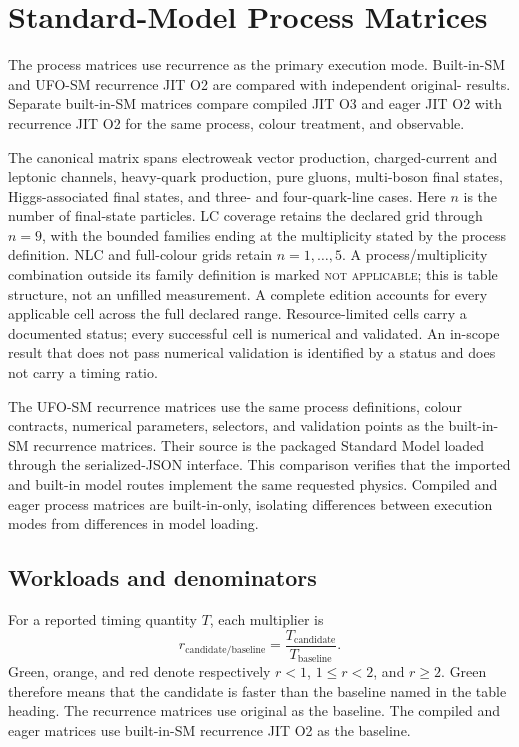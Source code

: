 \section{Standard-Model Process Matrices}
\label{sec:three-mode-performance-tables}

The process matrices use recurrence as the primary \PAC{} execution mode.
Built-in-SM and UFO-SM recurrence JIT O2 are compared with independent
original-\AC{} results.  Separate built-in-SM matrices compare compiled JIT O3
and eager JIT O2 with recurrence JIT O2 for the same process, colour treatment,
and observable.

The canonical matrix spans electroweak vector production, charged-current and
leptonic channels, heavy-quark production, pure gluons, multi-boson final
states, Higgs-associated final states, and three- and four-quark-line cases.
Here \(n\) is the number of final-state particles.  LC coverage retains the
declared grid through \(n=9\), with the bounded families ending at the
multiplicity stated by the process definition.  NLC and full-colour grids
retain \(n=1,\ldots,5\).  A process/multiplicity combination outside its family
definition is marked \textsc{not applicable}; this is table structure, not an
unfilled measurement.  A complete edition accounts for every applicable cell
across the full declared range.  Resource-limited cells carry a documented
status; every successful cell is numerical and validated.  An in-scope result
that does not pass numerical validation is identified by a status and does
not carry a timing ratio.

The UFO-SM recurrence matrices use the same process definitions, colour
contracts, numerical parameters, selectors, and validation points as the
built-in-SM recurrence matrices. Their source is the packaged Standard Model
loaded through the serialized-JSON interface. This comparison verifies that the
imported and built-in model routes implement the same requested physics.
Compiled and eager process matrices are built-in-only, isolating differences
between execution modes from differences in model loading.



\subsection*{Workloads and denominators}

For a reported timing quantity \(T\), each multiplier is
\begin{equation}
  r_{\mathrm{candidate/baseline}}
  = \frac{T_{\mathrm{candidate}}}{T_{\mathrm{baseline}}}.
  \label{eq:three-mode-matrix-time-ratio}
\end{equation}
Green, orange, and red denote respectively \(r<1\), \(1\leq r<2\), and
\(r\geq2\).  Green therefore means that the candidate is faster than the
baseline named in the table heading.  The recurrence matrices use original
\AC{} as the baseline.  The compiled and eager matrices use built-in-SM
recurrence JIT O2 as the baseline.

